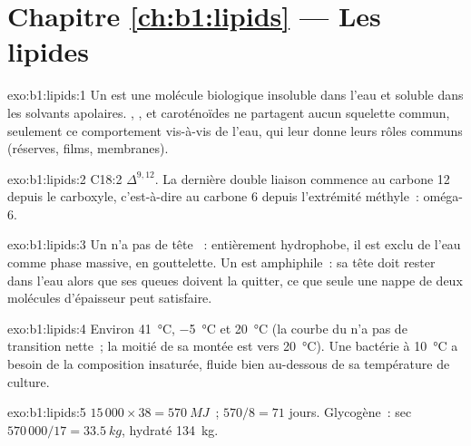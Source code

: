 \section*{Chapitre \ref{ch:b1:lipids} --- Les lipides}

\begin{solution}{exo:b1:lipids:1}
Un  est une molécule biologique insoluble dans l'eau et soluble
dans les solvants apolaires. , ,  et
caroténoïdes ne partagent aucun squelette commun, seulement ce
comportement vis-à-vis de l'eau, qui leur donne leurs rôles communs
(réserves, films, membranes).
\end{solution}

\begin{solution}{exo:b1:lipids:2}
C18:2 $\Delta^{9,12}$. La dernière double liaison commence au carbone 12
depuis le carboxyle, c'est-à-dire au carbone 6 depuis l'extrémité
méthyle~: oméga-6.
\end{solution}

\begin{solution}{exo:b1:lipids:3}
Un  n'a pas de tête ~: entièrement hydrophobe, il est
exclu de l'eau comme phase massive, en gouttelette. Un  est
amphiphile~: sa tête  doit rester dans l'eau alors que ses queues
doivent la quitter, ce que seule une nappe de deux molécules
d'épaisseur peut satisfaire.
\end{solution}

\begin{solution}{exo:b1:lipids:4}
Environ \qty{41}{\celsius}, \qty{-5}{\celsius} et \qty{20}{\celsius}
(la courbe du  n'a pas de transition nette~; la moitié de sa
montée est vers \qty{20}{\celsius}). Une bactérie à \qty{10}{\celsius} a
besoin de la composition insaturée, fluide bien au-dessous de sa
température de culture.
\end{solution}

\begin{solution}{exo:b1:lipids:5}
$15\,000\times 38 = \qty{570}{MJ}$~; $570/8 = 71$ jours. Glycogène~: sec
$570\,000/17 = \qty{33.5}{kg}$, hydraté \qty{134}{kg}.
\end{solution}

